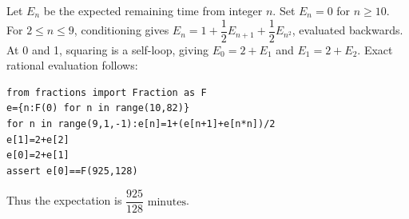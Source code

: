 Let $E_n$ be the expected remaining time from integer $n$. Set $E_n=0$ for $n\ge10$. For $2\le n\le9$, conditioning gives $E_n=1+\dfrac{1}{2}E_{n+1}+\dfrac{1}{2}E_{n^2}$, evaluated backwards. At 0 and 1, squaring is a self-loop, giving $E_0=2+E_1$ and $E_1=2+E_2$. Exact rational evaluation follows:
\begin{verbatim}
from fractions import Fraction as F
e={n:F(0) for n in range(10,82)}
for n in range(9,1,-1):e[n]=1+(e[n+1]+e[n*n])/2
e[1]=2+e[2]
e[0]=2+e[1]
assert e[0]==F(925,128)
\end{verbatim}
Thus the expectation is $\boxed{\dfrac{925}{128}\text{ minutes}}$.
